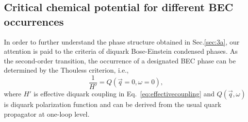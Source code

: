 \documentclass[prd, showpacs,nofootinbib,amsmath,amssymb,12pt]{revtex4}
\begin{document}
\subsection{Critical chemical potential for different BEC occurrences}
In order to further understand the phase structure obtained in Sec.\ref{sec:3a}, our attention is paid to the criteria  of diquark Bose-Einstein condensed phases.
As the second-order transition, the occurrence of a designated BEC phase can be determined by the Thouless criterion\cite{Nishida2005BCS}, i.e.,
\begin{equation}\label{eq:omegasecond}
 \frac{1}{H'}= Q(\vec{q} =0, \omega =0),
\end{equation}
where $H'$ is effective diquark coupling in Eq.~\eqref{eq:effectivecoupling} and $Q(\vec{q},\omega)$ is diquark polarization function and can be derived from the usual
quark propagator at one-loop level\cite{}.


\end{document}
